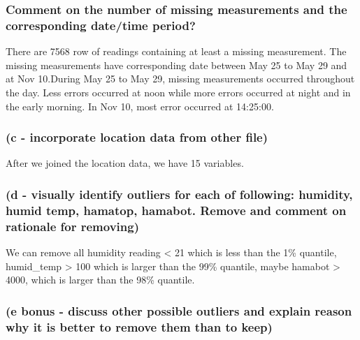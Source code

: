 \documentclass[
  twocolumn]{article}
\begin{document}
\hypertarget{comment-on-the-number-of-missing-measurements-and-the-corresponding-datetime-period}{%
\subsubsection{Comment on the number of missing measurements and the
corresponding date/time
period?}\label{comment-on-the-number-of-missing-measurements-and-the-corresponding-datetime-period}}

There are 7568 row of readings containing at least a missing
measurement. The missing measurements have corresponding date between
May 25 to May 29 and at Nov 10.During May 25 to May 29, missing
measurements occurred throughout the day. Less errors occurred at noon
while more errors occurred at night and in the early morning. In Nov 10,
most error occurred at 14:25:00.

\hypertarget{c---incorporate-location-data-from-other-file}{%
\subsubsection{(c - incorporate location data from other
file)}\label{c---incorporate-location-data-from-other-file}}

After we joined the location data, we have 15 variables.

\hypertarget{d---visually-identify-outliers-for-each-of-following-humidity-humid-temp-hamatop-hamabot.-remove-and-comment-on-rationale-for-removing}{%
\subsubsection{(d - visually identify outliers for each of following:
humidity, humid temp, hamatop, hamabot. Remove and comment on rationale
for
removing)}\label{d---visually-identify-outliers-for-each-of-following-humidity-humid-temp-hamatop-hamabot.-remove-and-comment-on-rationale-for-removing}}

We can remove all humidity reading \textless{} 21 which is less than the
1\% quantile, humid\_temp \textgreater{} 100 which is larger than the
99\% quantile, maybe hamabot \textgreater{} 4000, which is larger than
the 98\% quantile.

\hypertarget{e-bonus---discuss-other-possible-outliers-and-explain-reason-why-it-is-better-to-remove-them-than-to-keep}{%
\subsubsection{(e bonus - discuss other possible outliers and explain
reason why it is better to remove them than to
keep)}\label{e-bonus---discuss-other-possible-outliers-and-explain-reason-why-it-is-better-to-remove-them-than-to-keep}}
\end{document}
